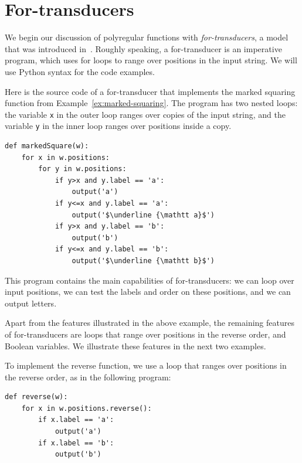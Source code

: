 \section{For-transducers}
\label{sec:for-transducers}
We begin our discussion of polyregular functions with  \emph{for-transducers}, a model that was introduced in~\cite[Section 3]{bojanczykPolyregularFunctions2018}. Roughly speaking, a for-transducer is an imperative program, which uses for loops to range over positions in the input string.  We will use Python syntax for the code examples.


\begin{myexample}
  \label{ex:marked-squaring-for-transducer}
  Here is the source code of a for-transducer that implements the marked squaring function from Example~\ref{ex:marked-squaring}. The program has two nested loops: the variable {\tt x} in the outer loop ranges over copies of the input string, and the variable {\tt y} in the inner loop ranges over positions inside a copy. 
  \begin{lstlisting}
def markedSquare(w):
    for x in w.positions:
        for y in w.positions:
            if y>x and y.label == 'a':
                output('a')
            if y<=x and y.label == 'a':
                output('$\underline {\mathtt a}$')
            if y>x and y.label == 'b':
                output('b')
            if y<=x and y.label == 'b':
                output('$\underline {\mathtt b}$')
\end{lstlisting}
This program contains the main capabilities of for-transducers: we can loop over input positions, we can test the labels and order on these positions, and we can output letters.
\end{myexample}

Apart from the features illustrated in the above example, the remaining features of for-transducers are loops that range over positions in the reverse order, and Boolean variables. We illustrate these features in the next two examples.

\begin{myexample}[Reverse]\label{ex:reverse-for-transducer}
  To implement the reverse function, we use a loop that ranges over positions in the reverse order, as in the following program:
  \begin{lstlisting}
def reverse(w):
    for x in w.positions.reverse():  
        if x.label == 'a':
            output('a')
        if x.label == 'b':
            output('b')
\end{lstlisting}
\end{myexample}


